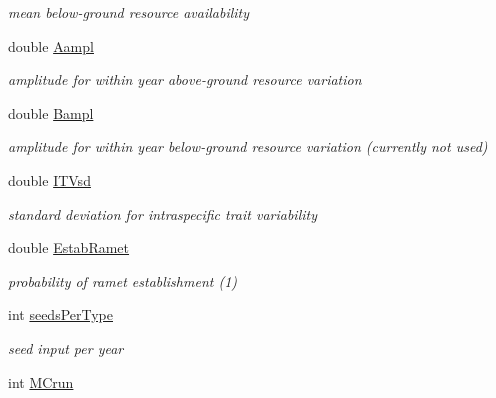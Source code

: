 \begin{DoxyCompactItemize}
\begin{DoxyCompactList}\small\item\em mean below-\/ground resource availability \end{DoxyCompactList}\item 
\mbox{\label{struct_s_run_para_a8302b2997efb0a71d57511192a6d1643}} 
double \mbox{\hyperlink{struct_s_run_para_a8302b2997efb0a71d57511192a6d1643}{Aampl}}
\begin{DoxyCompactList}\small\item\em amplitude for within year above-\/ground resource variation \end{DoxyCompactList}\item 
\mbox{\label{struct_s_run_para_a82412884bc5ccf7fa9008c2167c24d8b}} 
double \mbox{\hyperlink{struct_s_run_para_a82412884bc5ccf7fa9008c2167c24d8b}{Bampl}}
\begin{DoxyCompactList}\small\item\em amplitude for within year below-\/ground resource variation (currently not used) \end{DoxyCompactList}\item 
\mbox{\label{struct_s_run_para_a7bc9175a4469a39f1453b890699ad8ee}} 
double \mbox{\hyperlink{struct_s_run_para_a7bc9175a4469a39f1453b890699ad8ee}{I\+T\+Vsd}}
\begin{DoxyCompactList}\small\item\em standard deviation for intraspecific trait variability \end{DoxyCompactList}\item 
\mbox{\label{struct_s_run_para_ab172e974e5363cd027eb38a56f6aebea}} 
double \mbox{\hyperlink{struct_s_run_para_ab172e974e5363cd027eb38a56f6aebea}{Estab\+Ramet}}
\begin{DoxyCompactList}\small\item\em probability of ramet establishment (1) \end{DoxyCompactList}\item 
\mbox{\label{struct_s_run_para_a01c83df122c37d33f9b629ad0c293cb9}} 
int \mbox{\hyperlink{struct_s_run_para_a01c83df122c37d33f9b629ad0c293cb9}{seeds\+Per\+Type}}
\begin{DoxyCompactList}\small\item\em seed input per year \end{DoxyCompactList}\item 
int \mbox{\hyperlink{struct_s_run_para_a2a27f5c7f845060ffbb177fb4ba08ed8}{M\+Crun}}
\end{DoxyCompactItemize}
